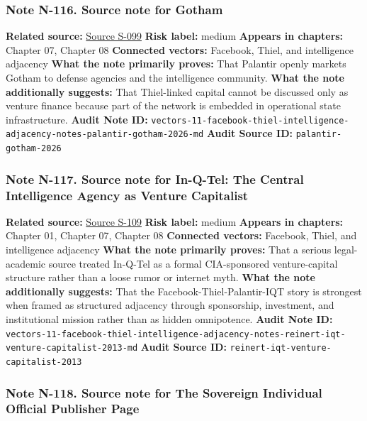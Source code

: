 \documentclass[
  american,
  11pt,
  letterpaper,
]{article}
\begin{document}
\subsubsection{Note N-116. Source note for
Gotham}\label{note-n-116-vectors-11-facebook-thiel-intelligence-adjacency-notes-palantir-gotham-2026-md}

\textbf{Related source:} \hyperref[source-s-099-gotham]{Source S-099}
\textbf{Risk label:} medium \textbf{Appears in chapters:} Chapter 07,
Chapter 08 \textbf{Connected vectors:} Facebook, Thiel, and intelligence
adjacency \textbf{What the note primarily proves:} That Palantir openly
markets Gotham to defense agencies and the intelligence community.
\textbf{What the note additionally suggests:} That Thiel-linked capital
cannot be discussed only as venture finance because part of the network
is embedded in operational state infrastructure. \textbf{Audit Note ID:}
\texttt{vectors-11-facebook-thiel-intelligence-adjacency-notes-palantir-gotham-2026-md}
\textbf{Audit Source ID:} \texttt{palantir-gotham-2026}

\subsubsection{Note N-117. Source note for In-Q-Tel: The Central
Intelligence Agency as Venture
Capitalist}\label{note-n-117-vectors-11-facebook-thiel-intelligence-adjacency-notes-reinert-iqt-venture-capitalist-2013-md}

\textbf{Related source:}
\hyperref[source-s-109-in-q-tel-the-central-intelligence-agency-as-venture-capitalist]{Source
S-109} \textbf{Risk label:} medium \textbf{Appears in chapters:} Chapter
01, Chapter 07, Chapter 08 \textbf{Connected vectors:} Facebook, Thiel,
and intelligence adjacency \textbf{What the note primarily proves:} That
a serious legal-academic source treated In-Q-Tel as a formal
CIA-sponsored venture-capital structure rather than a loose rumor or
internet myth. \textbf{What the note additionally suggests:} That the
Facebook-Thiel-Palantir-IQT story is strongest when framed as structured
adjacency through sponsorship, investment, and institutional mission
rather than as hidden omnipotence. \textbf{Audit Note ID:}
\texttt{vectors-11-facebook-thiel-intelligence-adjacency-notes-reinert-iqt-venture-capitalist-2013-md}
\textbf{Audit Source ID:} \texttt{reinert-iqt-venture-capitalist-2013}

\subsubsection{Note N-118. Source note for The Sovereign Individual
\textbar{} Official Publisher
Page}\label{note-n-118-vectors-11-facebook-thiel-intelligence-adjacency-notes-simon-schuster-sovereign-individual-2020-md}
\end{document}
